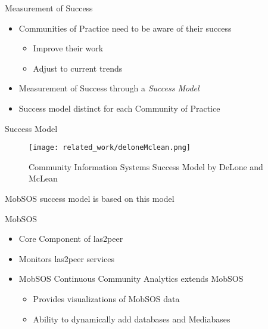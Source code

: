\begin{frame}{Measurement of Success}
  \begin{itemize}
    \item Communities of Practice need to be aware of their success
          \begin{itemize}
            \item Improve their work
            \item Adjust to current trends
          \end{itemize}
    \item Measurement of Success through a \emph{Success Model}
    \item Success model distinct for each Community of Practice %

  \end{itemize}
\end{frame}
\begin{frame}{Success Model}
  \begin{figure}[!h]
    \centering
    \texttt{[image: related\_work/deloneMclean.png]}
    \caption{Community Information Systems Success Model by DeLone and McLean \cite{DeMc92}}
  \end{figure}
  MobSOS success model is based on this model
\end{frame}

\begin{frame}{MobSOS}

  \begin{itemize}
    \item Core Component of las2peer
    \item Monitors las2peer services
    \item MobSOS Continuous Community Analytics extends MobSOS
          \begin{itemize}
            \item Provides visualizations of MobSOS data
            \item Ability to dynamically add databases and Mediabases
          \end{itemize}
  \end{itemize}
\end{frame}

